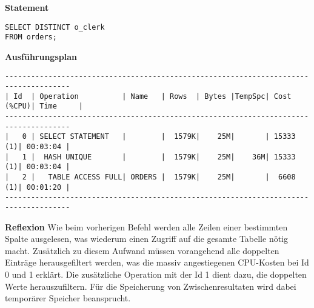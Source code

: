 \documentclass[10pt]{article}
\begin{document}
\textbf{Statement}
\begin{lstlisting}[style=sql]
SELECT DISTINCT o_clerk
FROM orders;
\end{lstlisting}
\textbf{Ausführungsplan}
\begin{lstlisting}[style=queryexecutionplan]
-------------------------------------------------------------------------------------                                                                                                                                                                                                                        
| Id  | Operation          | Name   | Rows  | Bytes |TempSpc| Cost (%CPU)| Time     |                                                                                                                                                                                                                        
-------------------------------------------------------------------------------------                                                                                                                                                                                                                        
|   0 | SELECT STATEMENT   |        |  1579K|    25M|       | 15333   (1)| 00:03:04 |                                                                                                                                                                                                                        
|   1 |  HASH UNIQUE       |        |  1579K|    25M|    36M| 15333   (1)| 00:03:04 |                                                                                                                                                                                                                        
|   2 |   TABLE ACCESS FULL| ORDERS |  1579K|    25M|       |  6608   (1)| 00:01:20 |                                                                                                                                                                                                                        
-------------------------------------------------------------------------------------
\end{lstlisting} 
\textbf{Reflexion} \newline
Wie beim vorherigen Befehl werden alle Zeilen einer bestimmten Spalte ausgelesen,
was wiederum einen Zugriff auf die gesamte Tabelle nötig macht.
Zusätzlich zu diesem Aufwand müssen vorangehend alle doppelten Einträge herausgefiltert werden,
was die massiv angestiegenen CPU-Kosten bei Id 0 und 1 erklärt.
Die zusätzliche Operation mit der Id 1 dient dazu, die doppelten Werte herauszufiltern.
Für die Speicherung von Zwischenresultaten wird dabei temporärer Speicher beansprucht.
\end{document}
